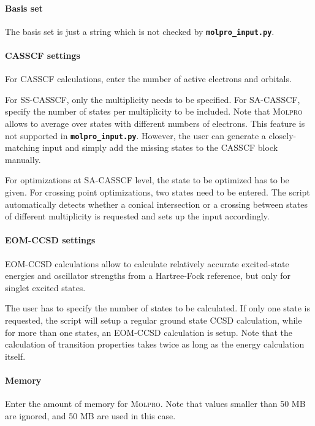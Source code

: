 \documentclass[a4paper,10pt,DIV=15,openany]{scrbook}
\newcommand{\ttt}[1]{\textbf{\texttt{#1}}}
\begin{document}
\paragraph{Basis set}

The basis set is just a string which is not checked by \ttt{molpro\_input.py}. 

\paragraph{CASSCF settings}

For CASSCF calculations, enter the number of active electrons and orbitals. 

For SS-CASSCF, only the multiplicity needs to be specified. For SA-CASSCF, specify the number of states per multiplicity to be included. Note that \textsc{Molpro} allows to average over states with different numbers of electrons. This feature is not supported in \ttt{molpro\_input.py}. However, the user can generate a closely-matching input and simply add the missing states to the CASSCF block manually. 

For optimizations at SA-CASSCF level, the state to be optimized has to be given. For crossing point optimizations, two states need to be entered. The script automatically detects whether a conical intersection or a crossing between states of different multiplicity is requested and sets up the input accordingly.

\paragraph{EOM-CCSD settings}

EOM-CCSD calculations allow to calculate relatively accurate excited-state energies and oscillator strengths from a Hartree-Fock reference, but only for singlet excited states.

The user has to specify the number of states to be calculated. If only one state is requested, the script will setup a regular ground state CCSD calculation, while for more than one states, an EOM-CCSD calculation is setup.
Note that the calculation of transition properties takes twice as long as the energy calculation itself.

\paragraph{Memory}

Enter the amount of memory for \textsc{Molpro}. Note that values smaller than 50 MB are ignored, and 50 MB are used in this case.
\end{document}

